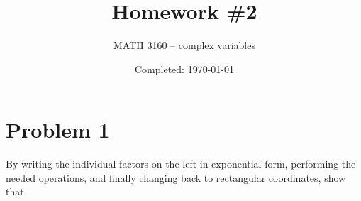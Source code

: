 \documentclass{article}
\title{Homework \#2}
\author{
  MATH 3160 -- complex variables\\
  \myauthor
}
\date{Completed: \today}
\begin{document}
\maketitle %


\section*{Problem 1}
By writing the individual factors on the left in exponential form, performing the needed
operations, and finally changing back to rectangular coordinates, show that
\end{document}
